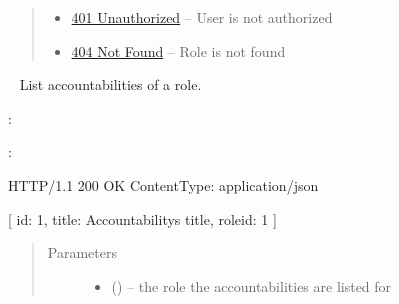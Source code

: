 \documentclass[letterpaper,10pt,english]{sphinxmanual}
\begin{document}
\begin{fulllineitems}
\begin{quote}
\begin{description}
\begin{itemize}
\item {} 
\href{http://www.w3.org/Protocols/rfc2616/rfc2616-sec10.html\#sec10.4.2}{401 Unauthorized} -- User is not authorized

\item {} 
\href{http://www.w3.org/Protocols/rfc2616/rfc2616-sec10.html\#sec10.4.5}{404 Not Found} -- Role is not found

\end{itemize}

\end{description}\end{quote}

\end{fulllineitems}



\begin{fulllineitems}
\label{\detokenize{resources/role:get--roles-(role_id)-accountabilities}}~
List accountabilities of a role.

:

\begin{sphinxVerbatim}[commandchars=\\\{\}]
  
 
 
\end{sphinxVerbatim}

:

\begin{sphinxVerbatim}[commandchars=\\\{\}]
HTTP/1.1 200 OK
Content\PYGZhy{}Type: application/json

[
    \PYGZob{}
        \PYGZsq{}id\PYGZsq{}: 1,
        \PYGZsq{}title\PYGZsq{}: \PYGZsq{}Accountability\PYGZsq{}s title\PYGZsq{},
        \PYGZsq{}role\PYGZus{}id\PYGZsq{}: 1
    \PYGZcb{}
]
\end{sphinxVerbatim}
\begin{quote}\begin{description}
\item[{Parameters}] \leavevmode\begin{itemize}
\item {} 
 () -- the role the accountabilities are listed for


\end{itemize}
\end{description}
\end{quote}
\end{fulllineitems}
\end{document}
